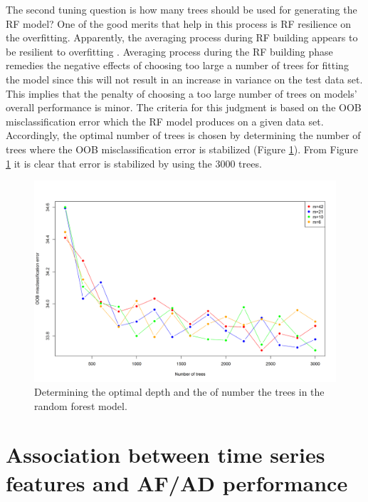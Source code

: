 \documentclass[preprint, 3p,
authoryear]{elsarticle} %
\begin{document}
The second tuning question is how many trees should be used for
generating the RF model? One of the good merits that help in this
process is RF resilience on the overfitting. Apparently, the averaging
process during RF building appears to be resilient to overfitting
\citep{friedman2001elements}. Averaging process during the RF building
phase remedies the negative effects of choosing too large a number of
trees for fitting the model since this will not result in an increase in
variance on the test data set. This implies that the penalty of choosing
a too large number of trees on models' overall performance is minor. The
criteria for this judgment is based on the OOB misclassification error
which the RF model produces on a given data set. Accordingly, the
optimal number of trees is chosen by determining the number of trees
where the OOB misclassification error is stabilized (Figure
\ref{fig:tree_depth}). From Figure \ref{fig:tree_depth} it is clear that
error is stabilized by using the 3000 trees.

\begin{figure}[H]

{\centering \includegraphics[width=0.9\linewidth]{img/300dpi/Fig_tree_depth_and_ntrees} 

}

\caption{Determining the optimal depth and the of number the trees in the random forest model.}\label{fig:tree_depth}
\end{figure}

\hypertarget{res}{%
\section{Association between time series features and AF/AD
performance}\label{res}}
\end{document}
